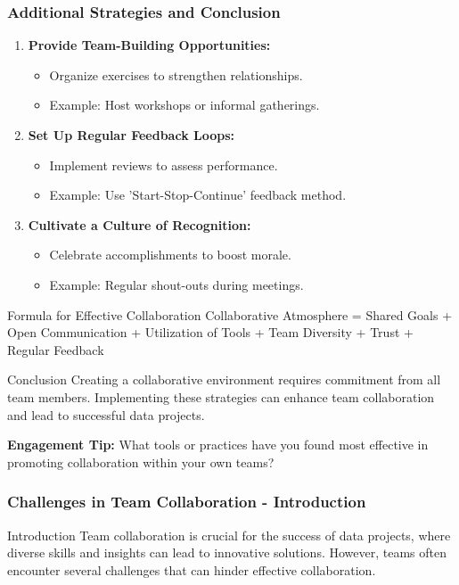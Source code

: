 \documentclass[aspectratio=169]{beamer}
\begin{document}
\begin{frame}[fragile]
    \frametitle{Additional Strategies and Conclusion}
    \begin{enumerate}[resume]
        \item \textbf{Provide Team-Building Opportunities:}
            \begin{itemize}
                \item Organize exercises to strengthen relationships.
                \item Example: Host workshops or informal gatherings.
            \end{itemize}
        \item \textbf{Set Up Regular Feedback Loops:}
            \begin{itemize}
                \item Implement reviews to assess performance.
                \item Example: Use 'Start-Stop-Continue' feedback method.
            \end{itemize}
        \item \textbf{Cultivate a Culture of Recognition:}
            \begin{itemize}
                \item Celebrate accomplishments to boost morale.
                \item Example: Regular shout-outs during meetings.
            \end{itemize}
    \end{enumerate}
    
    \begin{block}{Formula for Effective Collaboration}
        Collaborative Atmosphere = Shared Goals + Open Communication + Utilization of Tools + Team Diversity + Trust + Regular Feedback
    \end{block}

    \begin{block}{Conclusion}
        Creating a collaborative environment requires commitment from all team members. 
        Implementing these strategies can enhance team collaboration and lead to successful data projects.
    \end{block}

    \textbf{Engagement Tip:} What tools or practices have you found most effective in promoting collaboration within your own teams?
\end{frame}

\begin{frame}[fragile]
    \frametitle{Challenges in Team Collaboration - Introduction}
    \begin{block}{Introduction}
        Team collaboration is crucial for the success of data projects, where diverse skills and insights can lead to innovative solutions. However, teams often encounter several challenges that can hinder effective collaboration. 
    \end{block}
\end{frame}
\end{document}
